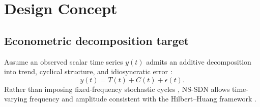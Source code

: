 \section{Design Concept}
\subsection{Econometric decomposition target}
Assume an observed scalar time series $y(t)$ admits an additive decomposition into trend, cyclical structure, and idiosyncratic error \citep{harvey1989,beveridge1981}:
\begin{equation}
y(t) = T(t) + C(t) + \epsilon(t).
\end{equation}
Rather than imposing fixed-frequency stochastic cycles \citep{harvey1989}, NS-SDN allows time-varying frequency and amplitude consistent with the Hilbert--Huang framework \citep{huang1998}.
